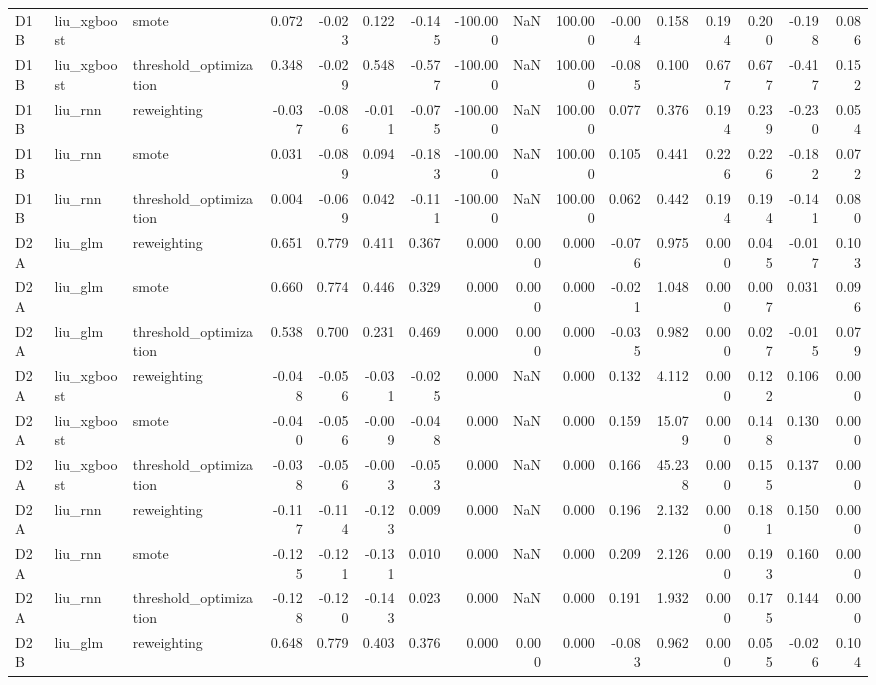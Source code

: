 \begin{tabular}{lllrrrrrrrrrrrrr}
D1B & liu_xgboost & smote & 0.072 & -0.023 & 0.122 & -0.145 & -100.000 & NaN & 100.000 & -0.004 & 0.158 & 0.194 & 0.200 & -0.198 & 0.086 \\
D1B & liu_xgboost & threshold_optimization & 0.348 & -0.029 & 0.548 & -0.577 & -100.000 & NaN & 100.000 & -0.085 & 0.100 & 0.677 & 0.677 & -0.417 & 0.152 \\
D1B & liu_rnn & reweighting & -0.037 & -0.086 & -0.011 & -0.075 & -100.000 & NaN & 100.000 & 0.077 & 0.376 & 0.194 & 0.239 & -0.230 & 0.054 \\
D1B & liu_rnn & smote & 0.031 & -0.089 & 0.094 & -0.183 & -100.000 & NaN & 100.000 & 0.105 & 0.441 & 0.226 & 0.226 & -0.182 & 0.072 \\
D1B & liu_rnn & threshold_optimization & 0.004 & -0.069 & 0.042 & -0.111 & -100.000 & NaN & 100.000 & 0.062 & 0.442 & 0.194 & 0.194 & -0.141 & 0.080 \\
D2A & liu_glm & reweighting & 0.651 & 0.779 & 0.411 & 0.367 & 0.000 & 0.000 & 0.000 & -0.076 & 0.975 & 0.000 & 0.045 & -0.017 & 0.103 \\
D2A & liu_glm & smote & 0.660 & 0.774 & 0.446 & 0.329 & 0.000 & 0.000 & 0.000 & -0.021 & 1.048 & 0.000 & 0.007 & 0.031 & 0.096 \\
D2A & liu_glm & threshold_optimization & 0.538 & 0.700 & 0.231 & 0.469 & 0.000 & 0.000 & 0.000 & -0.035 & 0.982 & 0.000 & 0.027 & -0.015 & 0.079 \\
D2A & liu_xgboost & reweighting & -0.048 & -0.056 & -0.031 & -0.025 & 0.000 & NaN & 0.000 & 0.132 & 4.112 & 0.000 & 0.122 & 0.106 & 0.000 \\
D2A & liu_xgboost & smote & -0.040 & -0.056 & -0.009 & -0.048 & 0.000 & NaN & 0.000 & 0.159 & 15.079 & 0.000 & 0.148 & 0.130 & 0.000 \\
D2A & liu_xgboost & threshold_optimization & -0.038 & -0.056 & -0.003 & -0.053 & 0.000 & NaN & 0.000 & 0.166 & 45.238 & 0.000 & 0.155 & 0.137 & 0.000 \\
D2A & liu_rnn & reweighting & -0.117 & -0.114 & -0.123 & 0.009 & 0.000 & NaN & 0.000 & 0.196 & 2.132 & 0.000 & 0.181 & 0.150 & 0.000 \\
D2A & liu_rnn & smote & -0.125 & -0.121 & -0.131 & 0.010 & 0.000 & NaN & 0.000 & 0.209 & 2.126 & 0.000 & 0.193 & 0.160 & 0.000 \\
D2A & liu_rnn & threshold_optimization & -0.128 & -0.120 & -0.143 & 0.023 & 0.000 & NaN & 0.000 & 0.191 & 1.932 & 0.000 & 0.175 & 0.144 & 0.000 \\
D2B & liu_glm & reweighting & 0.648 & 0.779 & 0.403 & 0.376 & 0.000 & 0.000 & 0.000 & -0.083 & 0.962 & 0.000 & 0.055 & -0.026 & 0.104 \\

\end{tabular}
